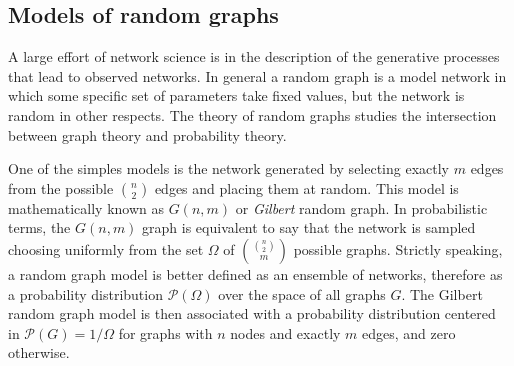 \subsection{Models of random graphs}

A large effort of network science is in the description of the generative processes that lead to observed networks. In general a random graph is a model network in which some specific set of parameters take fixed values, but the network is random in other respects.
The theory of random graphs studies the intersection between graph theory and probability theory. %

One of the simples models is the network generated by selecting exactly $m$ edges from the possible $\binom{n}{2}$ edges and placing them at random. This model is mathematically known as $G(n,m)$ or \emph{Gilbert} random graph. In probabilistic terms, the $G(n,m)$ graph is equivalent to say that the network is sampled choosing uniformly from the set $\Omega$ of $\binom{\binom{n}{2}}{m}$ possible graphs. Strictly speaking, a random graph model is better defined as an ensemble of networks, therefore as a probability distribution $\mathcal{P}(\Omega)$ over the space of all graphs $G$. The Gilbert random graph model is then associated with a probability distribution centered in $\mathcal{P}(G)=1/\Omega$ for graphs with $n$ nodes and exactly $m$ edges, and zero otherwise.

